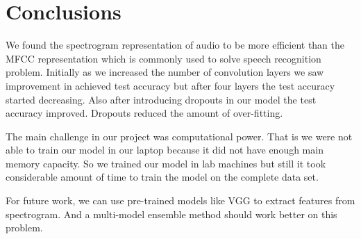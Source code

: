 \section{Conclusions}
We found the spectrogram representation of audio to be more efficient than the MFCC representation which is commonly used to solve speech recognition problem. Initially as we increased the number of convolution layers we saw improvement in achieved test accuracy but after four layers the test accuracy started decreasing. Also after introducing dropouts in our model the test accuracy improved. Dropouts reduced the amount of over-fitting. 
\par The main challenge in our project was computational power. That is we were not able to train our model in our laptop because it did not have enough main memory capacity. So we trained our model in lab machines but still it took considerable amount of time to train the model on the complete data set. 
\par For future work, we can use pre-trained models like VGG to extract features from spectrogram. And a multi-model ensemble method should work better on this problem. 